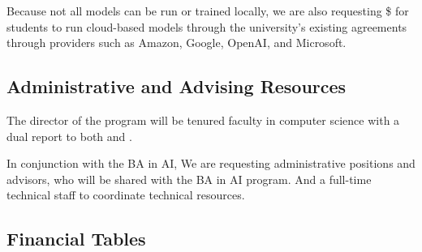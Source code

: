 Because not all models can be run or trained locally, we are also requesting \$\cloud{} for students to run cloud-based models through the university's existing agreements through providers such as Amazon, Google, OpenAI, and Microsoft.

\subsection{Administrative and Advising Resources}

The director of the program will be tenured faculty in computer science with a dual report to both  and .

In conjunction with the BA in AI, We are requesting \admin{} administrative positions and \advisors{} advisors, who will be shared with the BA in AI program.  And a full-time technical staff to coordinate technical resources.

\subsection{Financial Tables}